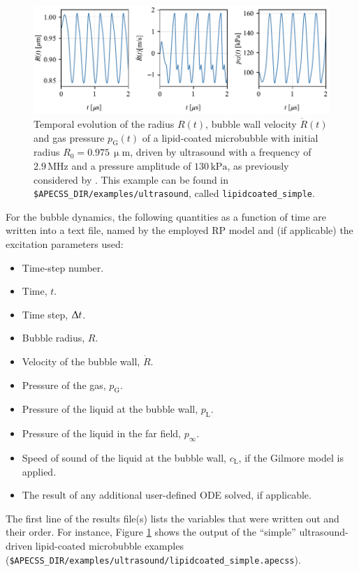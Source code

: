 \begin{figure}[t]
    \centering
    \includegraphics[width=\linewidth]{./figures/ultrasound_lipidcoated_simple.pdf}
    \caption{Temporal evolution of the radius $R(t)$, bubble wall velocity $\dot{R}(t)$ and gas pressure $p_\mathrm{G}(t)$ of a lipid-coated microbubble with initial radius $R_0 = 0.975 \, \upmu \mathrm{m}$, driven by ultrasound with a frequency of $2.9 \, \mathrm{MHz}$ and a pressure amplitude of $130 \, \mathrm{kPa}$, as previously considered by \citet{Marmottant2005}. This example can be found in {\tt \$APECSS\_DIR/examples/ultrasound}, called {\tt lipidcoated\_simple}.}
    \label{fig:bubble_results}
\end{figure}

For the bubble dynamics, the following quantities as a function of time are written into a text file, named by the employed RP model and (if applicable) the excitation parameters used:\vspace{-1em}
\begin{itemize}[noitemsep]
  \item Time-step number.
  \item Time, $t$.
  \item Time step, $\Updelta t$.
  \item Bubble radius, $R$.
  \item Velocity of the bubble wall, $\dot{R}$.
  \item Pressure of the gas, $p_\mathrm{G}$.
  \item Pressure of the liquid at the bubble wall, $p_\mathrm{L}$.
  \item Pressure of the liquid in the far field, $p_\infty$.
  \item Speed of sound of the liquid at the bubble wall, $c_\mathrm{L}$, if the Gilmore model is applied.
  \item The result of any additional user-defined ODE solved, if applicable.
\end{itemize}

The first line of the results file(s) lists the variables that were written out and their order. For instance, Figure \ref{fig:bubble_results} shows the output of the ``simple'' ultrasound-driven lipid-coated microbubble examples ({\tt \$APECSS\_DIR/examples/ultrasound/lipidcoated\_simple.apecss}).
